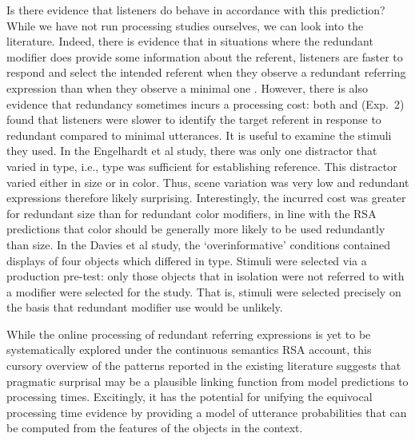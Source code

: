 \documentclass[11pt]{article}
\newcommand{\jd}[1]{\textcolor{Red}{[jd: #1]}}
\begin{document}
Is there evidence that listeners do behave in accordance with this prediction? While we have not run processing studies ourselves, we can look into the literature. Indeed, there is evidence that in situations where the redundant modifier does provide some information about the referent, listeners are faster to respond and select the intended referent when they observe a redundant referring expression than when they observe a minimal one \cite{Arts2011,  Paraboni2007}. However, there is also evidence that redundancy sometimes incurs a processing cost: both  and  (Exp.~2) found that listeners were slower to identify the target referent in response to redundant compared to minimal utterances. It is useful to examine the stimuli they used. In the Engelhardt et al study, there was only one distractor that varied in type, i.e., type was sufficient for establishing reference. This distractor varied either in size or in color. Thus, scene variation was very low and redundant expressions therefore likely surprising. Interestingly, the incurred cost was greater for redundant size than for redundant color modifiers, in line with the RSA predictions that color should be generally more likely to be used redundantly than size. In the Davies et al study, the `overinformative' conditions contained displays of four objects which differed in type. Stimuli were selected via a production pre-test: only those objects that in isolation were not referred to with a modifier were selected for the study. That is, stimuli were selected precisely on the basis that redundant modifier use would be unlikely.

While the online processing of redundant referring expressions is yet to be systematically explored under the continuous semantics RSA account, this cursory overview of the patterns reported in the existing literature suggests that pragmatic surprisal may be a plausible linking function from model predictions to processing times. Excitingly, it has the potential for unifying the equivocal processing time evidence by providing a model of utterance probabilities that can be computed from the features of the objects in the context.



\end{document}
